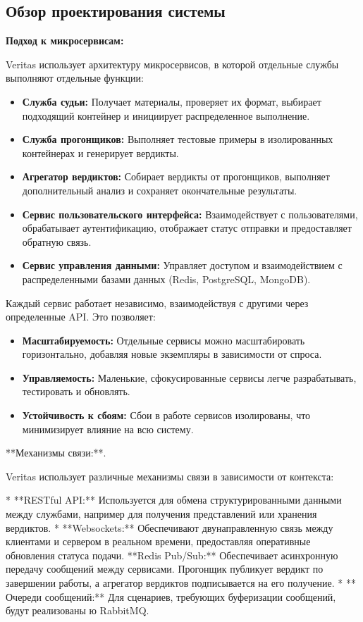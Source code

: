 \subsection{Обзор проектирования системы}

\textbf{Подход к микросервисам:}
\noindent

Veritas использует архитектуру микросервисов, в которой отдельные службы выполняют отдельные функции:
\noindent
\begin{itemize}
    \item \textbf{Служба судьи:} Получает материалы, проверяет их формат, выбирает подходящий контейнер и инициирует распределенное выполнение.
    \item \textbf{Служба прогонщиков:} Выполняет тестовые примеры в изолированных контейнерах и генерирует вердикты.
    \item \textbf{Агрегатор вердиктов:} Собирает вердикты от прогонщиков, выполняет дополнительный анализ и сохраняет окончательные результаты.
    \item \textbf{Сервис пользовательского интерфейса:} Взаимодействует с пользователями, обрабатывает аутентификацию, отображает статус отправки и предоставляет обратную связь.
    \item \textbf{Сервис управления данными:} Управляет доступом и взаимодействием с распределенными базами данных (Redis, PostgreSQL, MongoDB).
\end{itemize}

\noindent
Каждый сервис работает независимо, взаимодействуя с другими через определенные API. Это позволяет:

\begin{itemize}
    \item \textbf{Масштабируемость:} Отдельные сервисы можно масштабировать горизонтально, добавляя новые экземпляры в зависимости от спроса.
    \item \textbf{Управляемость:} Маленькие, сфокусированные сервисы легче разрабатывать, тестировать и обновлять.
    \item \textbf{Устойчивость к сбоям:} Сбои в работе сервисов изолированы, что минимизирует влияние на всю систему.
\end{itemize}

**Механизмы связи:**.

Veritas использует различные механизмы связи в зависимости от контекста:

* **RESTful API:** Используется для обмена структурированными данными между службами, например для получения представлений или хранения вердиктов.
* **Websockets:** Обеспечивают двунаправленную связь между клиентами и сервером в реальном времени, предоставляя оперативные обновления статуса подачи.
**Redis Pub/Sub:** Обеспечивает асинхронную передачу сообщений между сервисами. Прогонщик публикует вердикт по завершении работы, а агрегатор вердиктов подписывается на его получение.
* ** Очереди сообщений:** Для сценариев, требующих буферизации сообщений, будут реализованы ю RabbitMQ.


